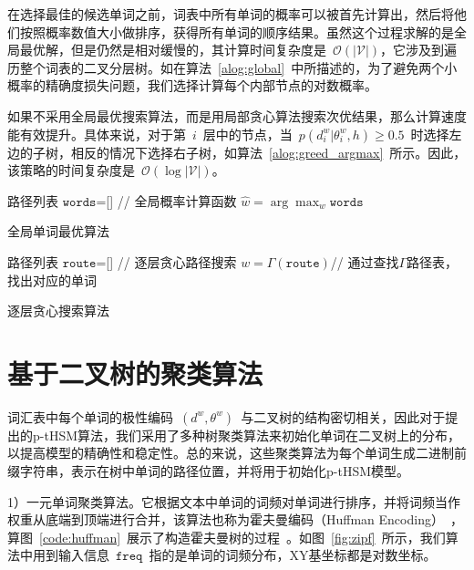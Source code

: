 在选择最佳的候选单词之前，词表中所有单词的概率可以被首先计算出，然后将他们按照概率数值大小做排序，获得所有单词的顺序结果。虽然这个过程求解的是全局最优解，但是仍然是相对缓慢的，其计算时间复杂度是~$\mathcal{O}(\mathcal{|V|})$，它涉及到遍历整个词表的二叉分层树。如在算法~\ref{alog:global}~中所描述的，为了避免两个小概率的精确度损失问题，我们选择计算每个内部节点的对数概率。


如果不采用全局最优搜索算法，而是用局部贪心算法搜索次优结果，那么计算速度能有效提升。具体来说，对于第~$i$~层中的节点，当~$p(d^w_i|\theta_{i}^w,h)\ge 0.5$~时选择左边的子树，相反的情况下选择右子树，如算法~\ref{alog:greed_argmax}~所示。因此，该策略的时间复杂度是~$\mathcal{O}(\log\mathcal{|V|})$。

\begin{algorithm}[!ht]
\SetAlgoLined
{}
 路径列表 $\mathtt{words}$=[] \;
{// 全局概率计算函数}\;
{$\hat w=\arg\max_w{\mathtt{words}}$}\;
\caption{全局单词最优算法}\label{alog:global}
\end{algorithm}

\begin{algorithm}[!ht]
\SetAlgoLined
{}
 路径列表 $\mathtt{route}$=[] \;
 {// 逐层贪心路径搜索}\;
$w=\Gamma(\mathtt{route})$// 通过查找$\Gamma$路径表，找出对应的单词\;
\caption{逐层贪心搜索算法\label{alog:greed_argmax}}
\end{algorithm}



\section{基于二叉树的聚类算法}
词汇表中每个单词的极性编码~$(d^w,\theta^w)$~与二叉树的结构密切相关，因此对于提出的p-tHSM算法，我们采用了多种树聚类算法来初始化单词在二叉树上的分布，以提高模型的精确性和稳定性。总的来说，这些聚类算法为每个单词生成二进制前缀字符串，表示在树中单词的路径位置，并将用于初始化p-tHSM模型。


1）一元单词聚类算法。它根据文本中单词的词频对单词进行排序，并将词频当作权重从底端到顶端进行合并，该算法也称为霍夫曼编码（Huffman Encoding）~，算图~\ref{code:huffman}~展示了构造霍夫曼树的过程~。如图~\ref{fig:zipf}~所示，我们算法中用到输入信息~$\texttt{freq}$~指的是单词的词频分布，XY基坐标都是对数坐标。


